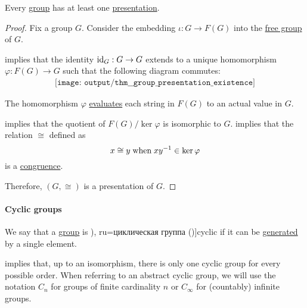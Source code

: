 \begin{proposition}\label{thm:group_presentation_existence}
  Every \hyperref[def:group]{group} has at least one \hyperref[def:group_presentation]{presentation}.
\end{proposition}
\begin{proof}
  Fix a group \( G \). Consider the embedding \( \iota: G \to F(G) \) into the \hyperref[def:free_group]{free group} of \( G \).

   implies that the identity \( {\operatorname{id}_G: G \to G} \) extends to a unique homomorphism \( \varphi: F(G) \to G \) such that the following diagram commutes:
  \begin{equation*}
    \begin{aligned}
      \texttt{[image: output/thm\_\_group\_presentation\_existence]}
    \end{aligned}
  \end{equation*}

  The homomorphism \( \varphi \) \hyperref[con:evaluation_homomorphism]{evaluates} each string in \( F(G) \) to an actual value in \( G \).

   implies that the quotient of \( F(G) / \ker \varphi \) is isomorphic to \( G \).  implies that the relation \( {\cong} \) defined as
  \begin{equation*}
    x \cong y \T{when} xy^{-1} \in \ker \varphi
  \end{equation*}
  is a \hyperref[def:first_order_congruence]{congruence}.

  Therefore, \( (G, \cong) \) is a presentation of \( G \).
\end{proof}

\paragraph{Cyclic groups}

\begin{definition}\label{def:cyclic_group}
  We say that a \hyperref[def:group]{group} is \term[ru=циклична группа (\cite[379]{Обрешков1962ВисшаАлгебра}), ru=циклическая группа (\cite[97]{Тыртышников2017ОсновыАлгебры})]{cyclic} if it can be \hyperref[def:group_presentation]{generated} by a single element.

   implies that, up to an isomorphism, there is only one cyclic group for every possible order. When referring to an abstract cyclic group, we will use the notation \( C_n \) for groups of finite cardinality \( n \) or \( C_\infty \) for (countably) infinite groups.
\end{definition}

